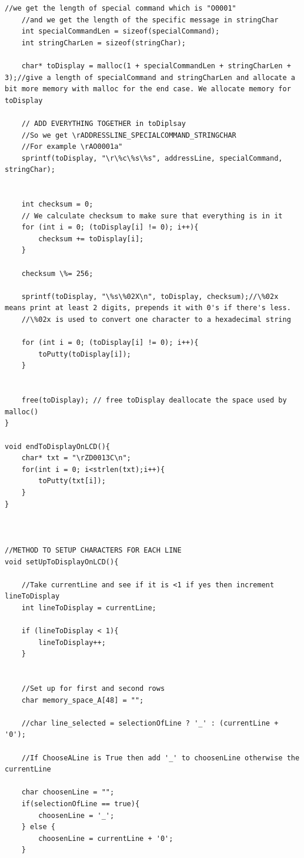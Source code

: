 \documentclass[a4paper,12pt]{article}
\begin{document}
\begin{lstlisting}[style=CStyle]
	//we get the length of special command which is "O0001"
    //and we get the length of the specific message in stringChar
	int specialCommandLen = sizeof(specialCommand);
	int stringCharLen = sizeof(stringChar);
    
	char* toDisplay = malloc(1 + specialCommandLen + stringCharLen + 3);//give a length of specialCommand and stringCharLen and allocate a bit more memory with malloc for the end case. We allocate memory for toDisplay

	// ADD EVERYTHING TOGETHER in toDiplsay
    //So we get \rADDRESSLINE_SPECIALCOMMAND_STRINGCHAR
    //For example \rAO0001a"
	sprintf(toDisplay, "\r\%c\%s\%s", addressLine, specialCommand, stringChar);

	
    int checksum = 0;
    // We calculate checksum to make sure that everything is in it
	for (int i = 0; (toDisplay[i] != 0); i++){
		checksum += toDisplay[i];
	}
	
	checksum \%= 256;

	sprintf(toDisplay, "\%s\%02X\n", toDisplay, checksum);//\%02x means print at least 2 digits, prepends it with 0's if there's less.
    //\%02x is used to convert one character to a hexadecimal string

	for (int i = 0; (toDisplay[i] != 0); i++){
		toPutty(toDisplay[i]);
	}
	

	free(toDisplay); // free toDisplay deallocate the space used by malloc()
}

void endToDisplayOnLCD(){
    char* txt = "\rZD0013C\n";
    for(int i = 0; i<strlen(txt);i++){
        toPutty(txt[i]);
    }
}



//METHOD TO SETUP CHARACTERS FOR EACH LINE
void setUpToDisplayOnLCD(){
    
	//Take currentLine and see if it is <1 if yes then increment lineToDisplay
	int lineToDisplay = currentLine;
    
    if (lineToDisplay < 1){
        lineToDisplay++;
    }
	
	
	//Set up for first and second rows
	char memory_space_A[48] = "";
    
	//char line_selected = selectionOfLine ? '_' : (currentLine + '0');
    
    //If ChooseALine is True then add '_' to choosenLine otherwise the currentLine

    char choosenLine = "";
    if(selectionOfLine == true){
        choosenLine = '_';
    } else {
        choosenLine = currentLine + '0';
    }


\end{lstlisting}
\end{document}
